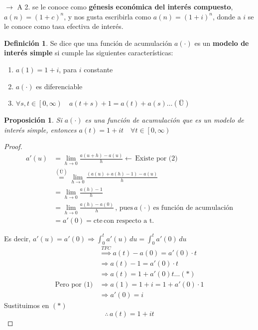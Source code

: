 \documentclass[
]{book}
\newtheorem{proposition}{Proposición}[chapter]
\theoremstyle{definition}
\newtheorem{definition}{Definición}[chapter]
\theoremstyle{definition}
\theoremstyle{definition}
\theoremstyle{definition}
\theoremstyle{remark}
\begin{document}
\(\longrightarrow\) A 2. se le conoce como \textbf{{génesis económica del interés compuesto}}, \(a(n) = (1+c)^n\), y nos gusta escribirla como \(a(n) = (1+i)^n\), donde a \(i\) se le conoce como {tasa efectiva de interés.}

\begin{definition}

Se dice que una función de acumulación \(a(\cdot )\) es un \textbf{{modelo de interés simple}} si cumple las siguientes características:

\begin{enumerate}
\def\labelenumi{\arabic{enumi}.}
\item
  \(a(1) = 1+ i\), para \(i\) constante
\item
  \(a(\cdot)\) es diferenciable
\item
  \(\forall s,t \in \left[0,\infty \right) \quad a(t+s)+1 = a(t) + a(s) \ldots (Ü)\)
\end{enumerate}

\end{definition}

\begin{proposition}
Si \(a(\cdot)\) es una función de acumulación que es un modelo de interés simple, entonces \(a(t) = 1 + it \quad \forall t\in \left[0,\infty \right)\)
\end{proposition}

\begin{proof}
\begin{align*}
a'(u) &= \lim\limits_{h \to 0} \frac{a(u+h)-a(u)}{h} \longleftarrow \, \text{Existe por (2)} \\
&\stackrel{(Ü)}{=} \lim\limits_{h \to 0} \frac{\left(a(u)+a(h)-1 \right) - a(u)}{h}\\
&= \lim\limits_{h \to 0} \frac{a(h)-1}{h}\\
&= \lim\limits_{h \to 0} \frac{a(h)-a(0)}{h}\, \text{, pues} \, a(\cdot) \, \text{es función de acumulación}\\
&= a'(0) = \text{cte} \, \text{con respecto a t.}
\end{align*}

Es decir, \(a'(u) = a'(0)\Longrightarrow \int_{0}^{t}a'(u)\,du = \int_{0}^{t}a'(0)\,du\)
\begin{align*}
&\stackrel{TFC}{\Longrightarrow} a(t) - a(0) = a'(0)\cdot t\\
&\Longrightarrow a(t) - 1 = a'(0)\cdot t\\
&\Longrightarrow a(t) = 1 + a'(0)t \ldots (*)\\
\text{Pero por (1)} \, &\Longrightarrow a(1) = 1+i = 1 + a'(0)\cdot 1\\
& \Longrightarrow a'(0) = i
\end{align*}
Sustituimos en \((*)\)
\[\therefore \, a(t) = 1+it\]
\end{proof}
\end{document}
